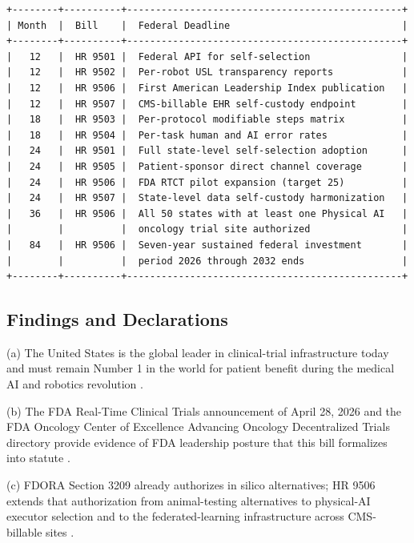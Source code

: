 \begin{verbatim}
+--------+----------+------------------------------------------------+
| Month  |  Bill    |  Federal Deadline                              |
+--------+----------+------------------------------------------------+
|   12   |  HR 9501 |  Federal API for self-selection                |
|   12   |  HR 9502 |  Per-robot USL transparency reports            |
|   12   |  HR 9506 |  First American Leadership Index publication   | 
|   12   |  HR 9507 |  CMS-billable EHR self-custody endpoint        |
|   18   |  HR 9503 |  Per-protocol modifiable steps matrix          | 
|   18   |  HR 9504 |  Per-task human and AI error rates             |
|   24   |  HR 9501 |  Full state-level self-selection adoption      |
|   24   |  HR 9505 |  Patient-sponsor direct channel coverage       |
|   24   |  HR 9506 |  FDA RTCT pilot expansion (target 25)          |
|   24   |  HR 9507 |  State-level data self-custody harmonization   | 
|   36   |  HR 9506 |  All 50 states with at least one Physical AI   |
|        |          |  oncology trial site authorized                |
|   84   |  HR 9506 |  Seven-year sustained federal investment       |
|        |          |  period 2026 through 2032 ends                 |
+--------+----------+------------------------------------------------+
\end{verbatim}

\subsection{Findings and Declarations}

\hspace{0.5cm} (a) The United States is the global leader in clinical-trial
infrastructure today and must remain Number 1 in the world for
patient benefit during the medical AI and robotics revolution
\cite{kawchak_2026_19244918, main_repo}.

(b) The FDA Real-Time Clinical Trials announcement of April 28,
2026 and the FDA Oncology Center of Excellence Advancing Oncology
Decentralized Trials directory provide evidence of FDA leadership
posture that this bill formalizes into statute
\cite{fda_rtct_press_2026, fda_oce_advancing_oncology_dct_2024}.

(c) FDORA Section 3209 already authorizes in silico alternatives;
HR 9506 extends that authorization from animal-testing alternatives
to physical-AI executor selection and to the federated-learning
infrastructure across CMS-billable sites
\cite{rank4_fdora_fda_modernization_2022}.

